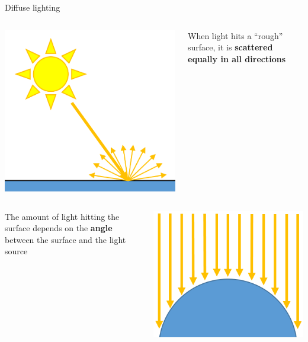 \begin{frame}{Diffuse lighting}
	\pause
	\begin{columns}
		\begin{column}{0.33\textwidth}
			\includegraphics[width=\textwidth]{diffuse_1}
		\end{column}
		\begin{column}{0.65\textwidth}
			When light hits a ``rough'' surface, it is \textbf{scattered equally in all directions}
		\end{column}
	\end{columns}
	\pause
	\begin{columns}
		\begin{column}{0.65\textwidth}
			The amount of light hitting the surface depends on the \textbf{angle} between the surface and the light source
		\end{column}
		\begin{column}{0.33\textwidth}
			\includegraphics[width=\textwidth]{diffuse_2}

\end{column}
\end{columns}
\end{frame}
